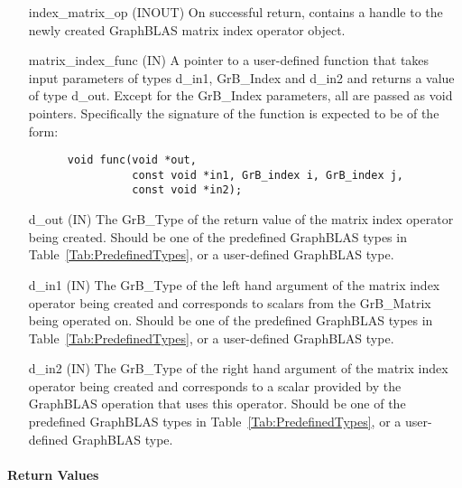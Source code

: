 \begin{itemize}[leftmargin=1.2in]
    \item[{\sf index\_matrix\_op}] ({\sf INOUT}) On successful return, contains a 
          handle to the newly created GraphBLAS matrix index operator object.
    \item[{\sf matrix\_index\_func}] ({\sf IN}) A pointer to a user-defined function that 
          takes input parameters of types {\sf d\_in1}, {\sf GrB\_Index} and {\sf d\_in2}
          and returns a value of type {\sf d\_out}.  Except for the {\sf GrB\_Index}
          parameters, all are  passed as {\sf void} pointers.
          Specifically the signature of the function is expected to 
          be of the form:
      \begin{verbatim}
      void func(void *out,
                const void *in1, GrB_index i, GrB_index j, 
                const void *in2);
      \end{verbatim}
    \item[{\sf d\_out}]  ({\sf IN}) The {\sf GrB\_Type} of the return
          value of the matrix index operator being created. Should be one of the
          predefined GraphBLAS types in Table~\ref{Tab:PredefinedTypes}, or a 
          user-defined GraphBLAS type.
    \item[{\sf d\_in1}]  ({\sf IN}) The {\sf GrB\_Type} of the left hand 
          argument of the matrix index operator being created and corresponds to scalars 
          from the {\sf GrB\_Matrix} being operated on. Should be one of the
          predefined GraphBLAS types in Table~\ref{Tab:PredefinedTypes}, or a
          user-defined GraphBLAS type.
    \item[{\sf d\_in2}]  ({\sf IN}) The {\sf GrB\_Type} of the right hand 
          argument of the matrix index operator being created and corresponds to a
          scalar provided by the GraphBLAS operation that uses this operator. Should be one of the
          predefined GraphBLAS types in Table~\ref{Tab:PredefinedTypes}, or a 
          user-defined GraphBLAS type.
\end{itemize}

\paragraph{Return Values}

